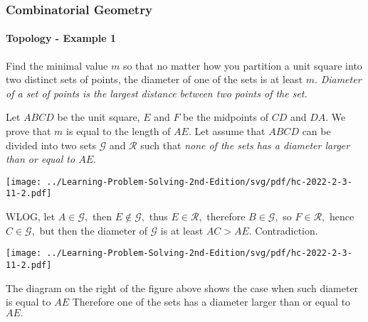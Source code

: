 \documentclass[8pt,xcolor=table,dvipsnames]{beamer}
\begin{document}
\begin{frame}[t]
    \frametitle{Combinatorial Geometry}
    \framesubtitle{Topology - Example 1}
    \begin{example}[HC-2022-SM2-R3-P11]
        Find the minimal value $m$ so that no matter how you partition
        a unit square into two distinct sets of points,
        the diameter of one of the sets is at least $m.$ 
        \textit{Diameter of a set of points is the largest distance between two points of the set.}
    \end{example}
    \begin{overprint}
        Let $ABCD$ be the unit square, $E$ and $F$ be the midpoints of $CD$ and $DA.$
        We prove that $m$ is equal to the length of $AE.$
        Let assume that $ABCD$ can be divided into two sets $\mathcal{G}$ and $\mathcal{R}$ such that
        \textit{none of the sets has a diameter larger than or equal to $AE.$}
        \begin{center}
            \texttt{[image: ../Learning-Problem-Solving-2nd-Edition/svg/pdf/hc-2022-2-3-11-2.pdf]}
        \end{center}    
        WLOG, let $A \in \mathcal{G},$ then $E \not \in \mathcal{G},$ thus $E \in \mathcal{R},$
        therefore $B \in \mathcal{G},$ so $F \in \mathcal{R},$ hence $C \in \mathcal{G},$
        but then the diameter of $\mathcal{G}$ is at least $AC > AE.$
        Contradiction.
        \begin{center}
            \texttt{[image: ../Learning-Problem-Solving-2nd-Edition/svg/pdf/hc-2022-2-3-11-2.pdf]}
        \end{center}    
        The diagram on the right of the figure above shows
        the case when such diameter is equal to $AE$
        Therefore one of the sets has a diameter larger than or equal to $AE.$
    \end{overprint}
\end{frame}
\end{document}
